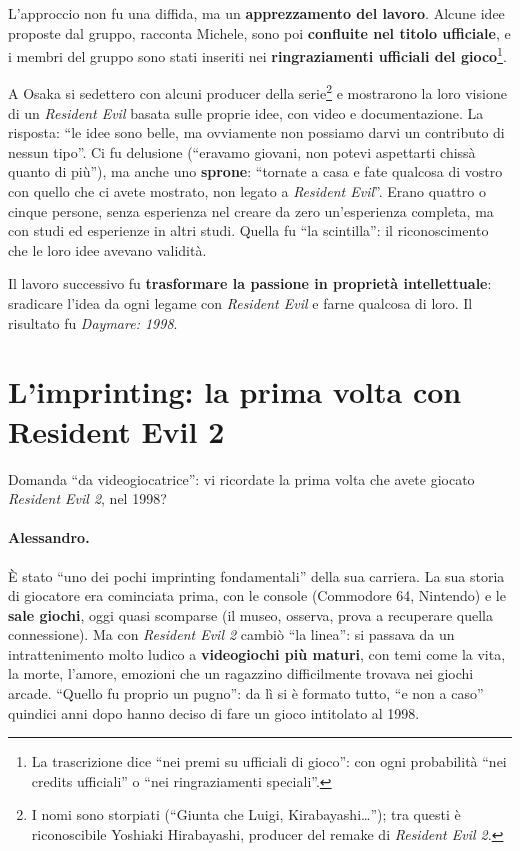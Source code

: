 L'approccio non fu una diffida, ma un \textbf{apprezzamento del lavoro}. Alcune
idee proposte dal gruppo, racconta Michele, sono poi \textbf{confluite nel titolo
ufficiale}, e i membri del gruppo sono stati inseriti nei \textbf{ringraziamenti
ufficiali del gioco}\footnote{La trascrizione dice ``nei premi su ufficiali di
gioco'': con ogni probabilità ``nei credits ufficiali'' o ``nei ringraziamenti
speciali''.}.

A Osaka si sedettero con alcuni producer della serie\footnote{I nomi sono
storpiati (``Giunta che Luigi, Kirabayashi\dots''); tra questi è riconoscibile
Yoshiaki Hirabayashi, producer del remake di \emph{Resident Evil 2}.} e
mostrarono la loro visione di un \emph{Resident Evil} basata sulle proprie idee,
con video e documentazione. La risposta: ``le idee sono belle, ma ovviamente non
possiamo darvi un contributo di nessun tipo''. Ci fu delusione (``eravamo
giovani, non potevi aspettarti chissà quanto di più''), ma anche uno
\textbf{sprone}: ``tornate a casa e fate qualcosa di vostro con quello che ci
avete mostrato, non legato a \emph{Resident Evil}''. Erano quattro o cinque
persone, senza esperienza nel creare da zero un'esperienza completa, ma con
studi ed esperienze in altri studi. Quella fu ``la scintilla'': il riconoscimento
che le loro idee avevano validità.

Il lavoro successivo fu \textbf{trasformare la passione in proprietà
intellettuale}: sradicare l'idea da ogni legame con \emph{Resident Evil} e farne
qualcosa di loro. Il risultato fu \emph{Daymare: 1998}.

\section{L'imprinting: la prima volta con Resident Evil 2}
\label{sec:c1-3-imprinting}

Domanda ``da videogiocatrice'': vi ricordate la prima volta che avete giocato
\emph{Resident Evil 2}, nel 1998?

\paragraph{Alessandro.} È stato ``uno dei pochi imprinting fondamentali'' della
sua carriera. La sua storia di giocatore era cominciata prima, con le console
(Commodore 64, Nintendo) e le \textbf{sale giochi}, oggi quasi scomparse (il
museo, osserva, prova a recuperare quella connessione). Ma con \emph{Resident
Evil 2} cambiò ``la linea'': si passava da un intrattenimento molto ludico a
\textbf{videogiochi più maturi}, con temi come la vita, la morte, l'amore,
emozioni che un ragazzino difficilmente trovava nei giochi arcade. ``Quello fu
proprio un pugno'': da lì si è formato tutto, ``e non a caso'' quindici anni dopo
hanno deciso di fare un gioco intitolato al 1998.

